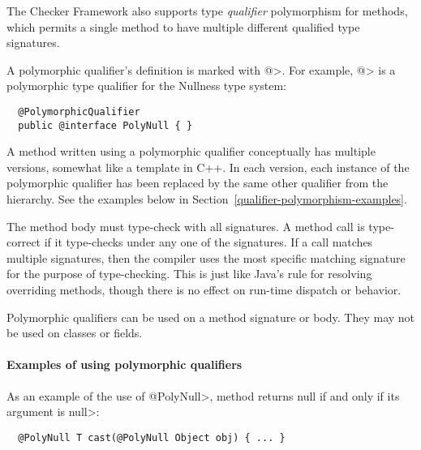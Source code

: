 The Checker Framework also supports type \emph{qualifier} polymorphism for methods,
which permits a single method to have multiple different qualified type
signatures.

A polymorphic qualifier's definition is marked with
\<@>.  For example, 
\<@> is a polymorphic type
qualifier for the Nullness type system:

\begin{Verbatim}
  @PolymorphicQualifier
  public @interface PolyNull { }
\end{Verbatim}

A method written using a polymorphic qualifier conceptually has multiple
versions, somewhat like a template in C++.  In each version, each instance
of the polymorphic qualifier has been replaced by the same other qualifier
from the
hierarchy.  See the examples below in Section~\ref{qualifier-polymorphism-examples}.

The method body must type-check with all signatures.  A method call is
type-correct if it type-checks under any one of the signatures.  If a call
matches multiple signatures, then the compiler uses the most specific
matching signature for the purpose of type-checking.  This is just like
Java's rule for resolving overriding methods, though there is no effect on
run-time dispatch or behavior.

Polymorphic qualifiers can be used on a method signature or body.
They may not be used on classes or fields.



\paragraph{Examples of using polymorphic qualifiers\label{qualifier-polymorphism-examples}}

As an example of the use of \<@PolyNull>, method 
returns null if and only if its argument is \<null>:

\begin{Verbatim}
  @PolyNull T cast(@PolyNull Object obj) { ... }
\end{Verbatim}

